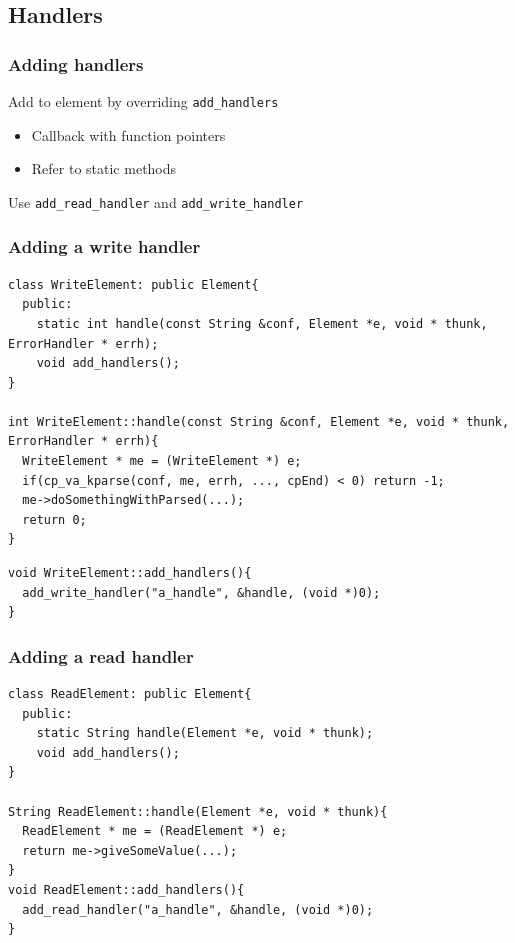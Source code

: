 \documentclass{beamer}
\begin{document}
\subsection{Handlers} %
\label{sub:handlers}
\begin{frame}[fragile]
\frametitle{Adding handlers}
Add to element by overriding \lstinline!add_handlers!
\begin{itemize}
	\item Callback with function pointers
	\item Refer to static methods
\end{itemize}
Use \lstinline!add_read_handler! and \lstinline!add_write_handler!
\end{frame}

\begin{frame}
\frametitle{Adding a write handler}
\begin{lstlisting}[basicstyle=\footnotesize]
class WriteElement: public Element{
  public:
    static int handle(const String &conf, Element *e, void * thunk, ErrorHandler * errh);
    void add_handlers();
}

int WriteElement::handle(const String &conf, Element *e, void * thunk, ErrorHandler * errh){
  WriteElement * me = (WriteElement *) e;
  if(cp_va_kparse(conf, me, errh, ..., cpEnd) < 0) return -1;
  me->doSomethingWithParsed(...);
  return 0;
}
\end{lstlisting}
\begin{lstlisting}[basicstyle=\footnotesize]
void WriteElement::add_handlers(){
  add_write_handler("a_handle", &handle, (void *)0);
}
\end{lstlisting}
\end{frame}

\begin{frame}[fragile]
\frametitle{Adding a read handler}
\begin{lstlisting}[basicstyle=\footnotesize]
class ReadElement: public Element{
  public:
    static String handle(Element *e, void * thunk);
    void add_handlers();
}

String ReadElement::handle(Element *e, void * thunk){
  ReadElement * me = (ReadElement *) e;
  return me->giveSomeValue(...);
}
void ReadElement::add_handlers(){
  add_read_handler("a_handle", &handle, (void *)0);
}
\end{lstlisting}
\end{frame}
\end{document}
